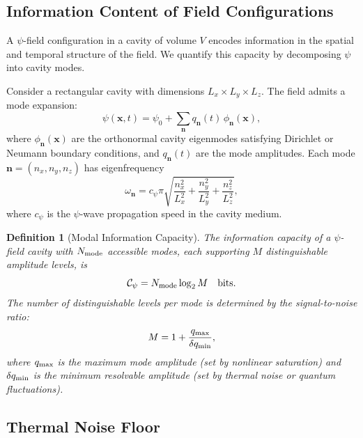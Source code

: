 \documentclass[12pt,a4paper,twoside]{article}
\newtheorem{definition}[theorem]{Definition}
\begin{document}
\subsection{Information Content of Field Configurations}\label{sec:info_content}

A $\psi$-field configuration in a cavity of volume $V$ encodes information in the spatial and temporal structure of the field. We quantify this capacity by decomposing $\psi$ into cavity modes.

Consider a rectangular cavity with dimensions $L_x \times L_y \times L_z$. The field admits a mode expansion:
\begin{equation}
\psi(\mathbf{x},t) = \psi_0 + \sum_{\mathbf{n}} q_{\mathbf{n}}(t)\,\phi_{\mathbf{n}}(\mathbf{x}),
\label{eq:mode_expansion}
\end{equation}
where $\phi_{\mathbf{n}}(\mathbf{x})$ are the orthonormal cavity eigenmodes satisfying Dirichlet or Neumann boundary conditions, and $q_{\mathbf{n}}(t)$ are the mode amplitudes. Each mode $\mathbf{n} = (n_x, n_y, n_z)$ has eigenfrequency
\begin{equation}
\omega_{\mathbf{n}} = c_\psi \pi \sqrt{\frac{n_x^2}{L_x^2} + \frac{n_y^2}{L_y^2} + \frac{n_z^2}{L_z^2}},
\label{eq:mode_freq}
\end{equation}
where $c_\psi$ is the $\psi$-wave propagation speed in the cavity medium.

\begin{definition}[Modal Information Capacity]
The information capacity of a $\psi$-field cavity with $N_{\rm mode}$ accessible modes, each supporting $M$ distinguishable amplitude levels, is
\begin{equation}
\mathcal{C}_\psi = N_{\rm mode} \log_2 M \quad \text{bits}.
\label{eq:info_capacity}
\end{equation}
The number of distinguishable levels per mode is determined by the signal-to-noise ratio:
\begin{equation}
M = 1 + \frac{q_{\rm max}}{\delta q_{\rm min}},
\label{eq:levels}
\end{equation}
where $q_{\rm max}$ is the maximum mode amplitude (set by nonlinear saturation) and $\delta q_{\rm min}$ is the minimum resolvable amplitude (set by thermal noise or quantum fluctuations).
\end{definition}

\subsection{Thermal Noise Floor}\label{sec:noise}
\end{document}
